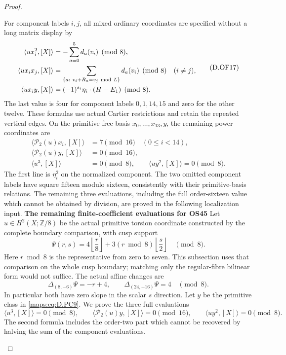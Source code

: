 \begin{proof}
\begin{enumerate}[label=\arabic*.,leftmargin=*]
For component labels \(i,j\), all mixed ordinary coordinates are
specified without a long matrix display by
\[
 \begin{aligned}
 \langle ux_i^2,[X]\rangle
                    &=-\sum_{a=0}^{5}d_a(v_i)\pmod8,\\
 \langle ux_ix_j,[X]\rangle
                    &=\sum_{\{a:\ v_i+R_a=v_j\ {\rm mod}\ L\}}
                                       d_a(v_i)\pmod8\quad(i\ne j),\\
 \langle ux_i y,[X]\rangle
                    &=(-1)^{s_i}\eta_i\cdot(H-E_1)\pmod8.
 \end{aligned}                                             \tag{D.OF17}\label{maps:eq:D.OF17}
\]
The last value is four for component labels \(0,1,14,15\)
and zero for the other twelve. These formulas use actual
Cartier restrictions and retain the repeated vertical edges.
On the primitive free basis \(x_0,\ldots,x_{13},y\), the remaining
power coordinates are
\[
 \begin{split}
 \langle\mathcal P_2(u)x_i,[X]\rangle&=7\pmod{16}
                                             \quad(0\le i<14),\\
 \langle\mathcal P_2(u)y,[X]\rangle&=0\pmod{16},\\
 \langle u^3,[X]\rangle&=0\pmod8,\qquad
 \langle uy^2,[X]\rangle=0\pmod8.
 \end{split}                                               \tag{D.OF18}\label{maps:eq:D.OF18}
\]
The first line is \(\eta_i^2\) on the normalized component.
The two omitted component labels have square fifteen modulo
sixteen, consistently with their primitive-basis relations.
The remaining three evaluations, including the full
order-sixteen value which cannot be obtained by division,
are proved in the following localization input.
\textbf{The remaining finite-coefficient evaluations for OS45}
Let $u\in H^2(X;\mathbb Z/8)$ be the actual primitive torsion
coordinate constructed by the complete boundary comparison, with
cusp support
\[
 \Psi(r,s)=4\left\lfloor\frac r8\right\rfloor
       +3(r\bmod8)\left\lfloor\frac s2\right\rfloor
                           \quad\pmod8.                  \tag{D.OL1}\label{maps:eq:D.OL1}
\]
Here $r\bmod8$ is the representative from zero to seven. This
subsection uses that comparison on the whole cusp boundary;
matching only the regular-fibre bilinear form would not suffice.
The actual affine changes are
\[
 \Delta_{(8,-6)}\Psi=-r+4,\qquad
 \Delta_{(24,-16)}\Psi=4\quad\pmod8.                     \tag{D.OL2}\label{maps:eq:D.OL2}
\]
In particular both have zero slope in the scalar $s$ direction.
Let $y$ be the primitive class in \eqref{maps:eq:D.PC9}.
We prove the three full evaluations
\[
 \langle u^3,[X]\rangle=0\pmod8,\qquad
 \langle\mathcal P_2(u)y,[X]\rangle=0\pmod{16},\qquad
 \langle uy^2,[X]\rangle=0\pmod8.                         \tag{D.OL3}\label{maps:eq:D.OL3}
\]
The second formula includes the order-two part which cannot be
recovered by halving the sum of the component evaluations.


\end{enumerate}
\end{proof}
